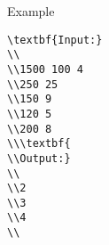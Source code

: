 Example
\begin{verbatim}
\textbf{Input:}
\\
\\1500 100 4
\\250 25
\\150 9
\\120 5
\\200 8
\\\textbf{
\\Output:}
\\
\\2
\\3
\\4
\\\end{verbatim}